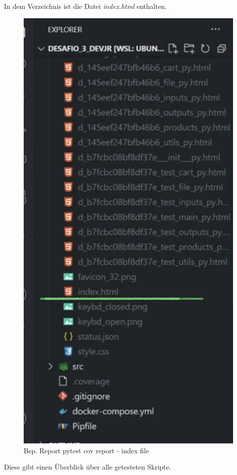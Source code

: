 In dem Verzeichnis ist die Datei \textit{index.html} enthalten.
\begin{figure}[H]
	\centering
	\includegraphics[scale = 0.6]{attachment/chapter_2/Scc095}
	\caption{Bsp. Report pytest cov report - index file}
\end{figure}
Diese gibt einen Überblick über alle getesteten Skripte.

